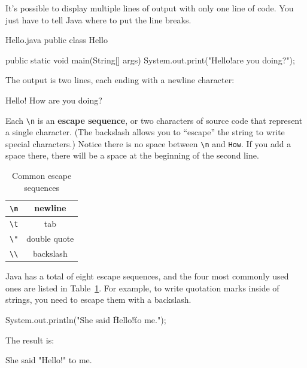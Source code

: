 It's possible to display multiple lines of output with only one line of code.
You just have to tell Java where to put the line breaks.

\begin{trinket}[220]{Hello.java}
public class Hello {

    public static void main(String[] args) {
        System.out.print("Hello!\nHow are you doing?\n");
    }
}
\end{trinket}

The output is two lines, each ending with a newline character:

\begin{stdout}
Hello!
How are you doing?
\end{stdout}


Each \verb"\n" is an {\bf escape sequence}, or two characters of source code that represent a single character.
(The backslash allows you to ``escape'' the string to write special characters.)
Notice there is no space between \verb"\n" and \verb"How".
If you add a space there, there will be a space at the beginning of the second line.

\begin{table}[!ht]
\begin{center}
\begin{tabular}{|c|c|}
\hline
\verb"\n" & newline \\
\hline
\verb"\t" & tab \\
\hline
\verb'\"' & double quote \\
\hline
\verb"\\" & backslash \\
\hline
\end{tabular}
\caption{Common escape sequences}
\label{tab:escape}
\end{center}
\end{table}

Java has a total of eight escape sequences, and the four most commonly used ones are listed in Table~\ref{tab:escape}.
For example, to write quotation marks inside of strings, you need to escape them with a backslash.

\begin{code}
System.out.println("She said \"Hello!\" to me.");
\end{code}

The result is:

\begin{stdout}
She said "Hello!" to me.
\end{stdout}


